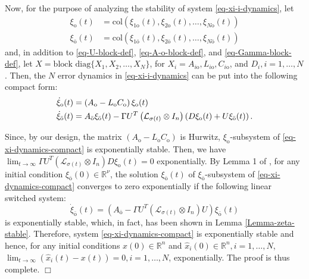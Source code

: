 \documentclass[twocolumn]{autart}
\newcommand{\RR}{\mathbb{R}}
\newenvironment{Proof}{\noindent{\em Proof:\/}}{\hfill $\Box$\par}
\begin{document}
\begin{Proof}
Now, for the purpose of analyzing the stability of system \eqref{eq-xi-i-dynamics},
let
\begin{align*}
    \xi_{\text{o}}(t)&=\text{col}\left(\xi_{1\text{o}}(t), \xi_{2\text{o}}(t), \ldots, \xi_{N\text{o}}(t) \right) \\
    \xi_{\bar{\text{o}}}(t)&=\text{col}\left(\xi_{1\bar{\text{o}}}(t), \xi_{2\bar{\text{o}}}(t), \ldots, \xi_{N\bar{\text{o}}}(t) \right)
\end{align*}
and, in addition to \eqref{eq-U-block-def}, \eqref{eq-A-o-block-def}, and \eqref{eq-Gamma-block-def},
let $X=\text{block diag}\{X_{1}, X_{2}, \ldots, X_{N} \}$,
for $X_{i}=A_{i\text{o}}, L_{i\text{o}}, C_{i\text{o}}$, and $D_{i}, i=1,\ldots,N$.
Then,  the $N$ error dynamics in \eqref{eq-xi-i-dynamics} can be put into the following compact form:
\begin{align}\label{eq-xi-dynamics-compact}
    \dot{\xi}_{\text{o}}(t) &= \left(A_{\text{o}}-L_{\text{o}}C_{\text{o}}\right)\xi_{\text{o}}(t) \notag\\
    \dot{\xi}_{\bar{\text{o}}}(t) &= A_{\bar{\text{o}}}\xi_{\bar{\text{o}}}(t)
    - \Gamma U^{T}\left(\mathcal{L}_{\sigma(t)} \otimes I_{n}\right)\left(D \xi_{\text{o}}(t) +U\xi_{\bar{\text{o}}}(t) \right).
\end{align}


Since, by our design, the matrix $\left(A_{\text{o}}-L_{\text{o}}C_{\text{o}}\right)$ is Hurwitz,
$\xi_{\text{o}}$-subsystem of \eqref{eq-xi-dynamics-compact} is exponentially stable.
Then, we have $\lim_{t\to\infty}\Gamma U^{T}\left(\mathcal{L}_{\sigma(t)} \otimes I_{n}\right)D \xi_{\text{o}}(t)=0$ exponentially.
By Lemma 1 of \cite{LTHuang18},
for any initial condition $\xi_{\bar{\text{o}}}(0) \in \RR^{\nu}$,
the solution $\xi_{\bar{\text{o}}}(t)$ of $\xi_{\bar{\text{o}}}$-subsystem of \eqref{eq-xi-dynamics-compact} converges to zero exponentially
if the following linear switched system:
\begin{equation}\label{eq-xi-dynamics-compact-unperturbed}
\dot{\xi}_{\bar{\text{o}}}(t) = \left(A_{\bar{\text{o}}}- \Gamma U^{T}\left(\mathcal{L}_{\sigma(t)} \otimes I_{n}\right)U \right)\xi_{\bar{\text{o}}}(t)
\end{equation}
is exponentially stable, which, in fact, has been shown in Lemma \ref{Lemma-zeta-stable}.
Therefore, system \eqref{eq-xi-dynamics-compact} is exponentially stable and hence,
for any initial conditions $x(0)\in \RR^{n}$ and $\hat{x}_{i}(0)\in \RR^{n}, i=1,\ldots,N$,
$\lim_{t\to\infty}(\hat{x}_{i}(t)-x(t))=0, i=1,\ldots,N$, exponentially.
The proof is thus complete.
\end{Proof}
\end{document}
